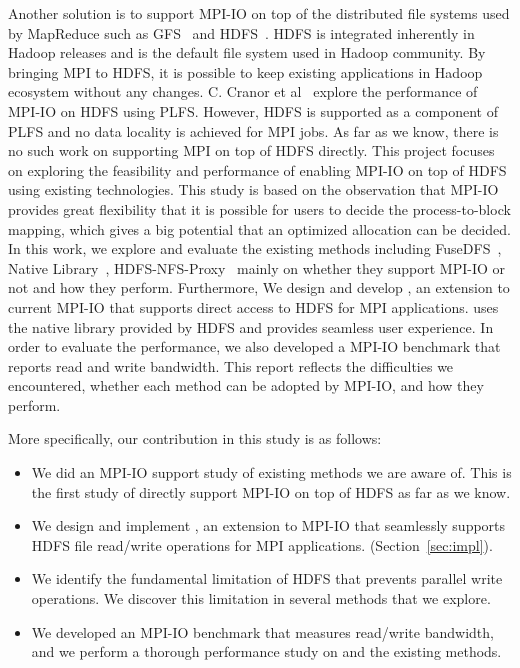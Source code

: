 Another solution is to support MPI-IO on top of the distributed file systems
used by MapReduce such as GFS~\cite{gfs} and HDFS~\cite{hdfs}. HDFS is integrated
inherently in Hadoop releases and is the default file system used in Hadoop
community. By bringing MPI to HDFS, it is possible to keep existing applications
in Hadoop ecosystem without any changes. C. Cranor et al~\cite{CMU-PDL-12-115} explore the
performance of MPI-IO on HDFS using PLFS. However, HDFS is supported as a
component of PLFS and no data locality is achieved for MPI jobs. As far as we
know, there is no such work on supporting MPI on top of HDFS directly. This
project focuses on exploring the feasibility and performance of enabling MPI-IO
on top of HDFS using existing technologies. This study is based on the
observation that MPI-IO provides great flexibility that it is possible for users
to decide the process-to-block mapping, which gives a big potential that an
optimized allocation can be decided. In this work, we explore and evaluate
the existing methods including FuseDFS~\cite{fuse}, Native Library~\cite{lib},
HDFS-NFS-Proxy~\cite{proxy} mainly on whether they support MPI-IO or not and how
they perform. Furthermore, We design and develop
{\proj}, an extension to current MPI-IO that supports direct access to HDFS for
MPI applications. {\proj} uses the native library provided by HDFS and provides
seamless user experience. In order to evaluate the performance, we also
developed a MPI-IO benchmark that reports read and write bandwidth. This report
reflects the difficulties we encountered, whether each method can be adopted by
MPI-IO, and how they perform. 

More specifically, our contribution in this study is as follows:
\begin{itemize}
\item We did an MPI-IO support study of existing methods we are aware of. This
	is the first study of directly support MPI-IO on top of HDFS as far as
	we know.
\item We design and implement {\proj}, an extension to MPI-IO that seamlessly
	supports HDFS file read/write operations for MPI applications. 
	(Section~\ref{sec:impl}).
\item We identify the fundamental limitation of HDFS that prevents parallel
	write operations. We discover this limitation in several methods that we
	explore.
\item We developed an MPI-IO benchmark that measures read/write bandwidth, and
	we perform a thorough performance study on {\proj} and the existing methods.
\end{itemize}

